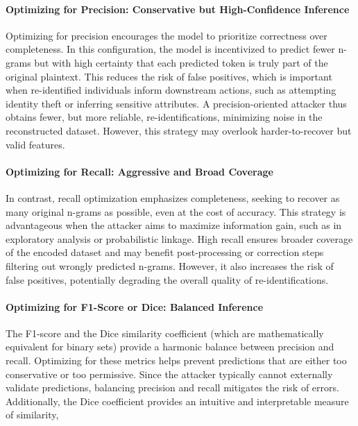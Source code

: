 \paragraph{Optimizing for Precision: Conservative but High-Confidence Inference}

Optimizing for precision encourages the model to prioritize correctness over completeness.
In this configuration, the model is incentivized to predict fewer n-grams but with high certainty that each predicted token is truly part of the original plaintext.
This reduces the risk of false positives, which is important when re-identified individuals inform downstream actions, such as attempting identity theft or inferring sensitive attributes.
A precision-oriented attacker thus obtains fewer, but more reliable, re-identifications, minimizing noise in the reconstructed dataset.
However, this strategy may overlook harder-to-recover but valid features.

\paragraph{Optimizing for Recall: Aggressive and Broad Coverage}

In contrast, recall optimization emphasizes completeness, seeking to recover as many original n-grams as possible, even at the cost of accuracy.
This strategy is advantageous when the attacker aims to maximize information gain, such as in exploratory analysis or probabilistic linkage.
High recall ensures broader coverage of the encoded dataset and may benefit post-processing or correction steps filtering out wrongly predicted n-grams.
However, it also increases the risk of false positives, potentially degrading the overall quality of re-identifications.

\paragraph{Optimizing for F1-Score or Dice: Balanced Inference}

The F1-score and the Dice similarity coefficient (which are mathematically equivalent for binary sets) provide a harmonic balance between precision and recall.
Optimizing for these metrics helps prevent predictions that are either too conservative or too permissive.
Since the attacker typically cannot externally validate predictions, balancing precision and recall mitigates the risk of errors.
Additionally, the Dice coefficient provides an intuitive and interpretable measure of similarity,

